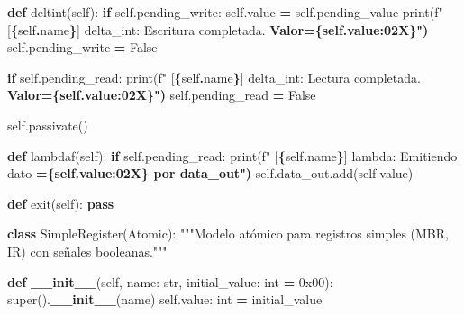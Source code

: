 \documentclass[12pt,oneside]{templates/unerthesis}
\newenvironment{Shaded}{\begin{snugshade}}{\end{snugshade}}
\newcommand{\BaseNTok}[1]{\textcolor[rgb]{0.00,0.00,0.81}{#1}}
\newcommand{\BuiltInTok}[1]{#1}
\newcommand{\ControlFlowTok}[1]{\textcolor[rgb]{0.13,0.29,0.53}{\textbf{#1}}}
\newcommand{\ErrorTok}[1]{\textcolor[rgb]{0.64,0.00,0.00}{\textbf{#1}}}
\newcommand{\FunctionTok}[1]{\textcolor[rgb]{0.13,0.29,0.53}{\textbf{#1}}}
\newcommand{\KeywordTok}[1]{\textcolor[rgb]{0.13,0.29,0.53}{\textbf{#1}}}
\newcommand{\NormalTok}[1]{#1}
\newcommand{\OperatorTok}[1]{\textcolor[rgb]{0.81,0.36,0.00}{\textbf{#1}}}
\newcommand{\SpecialCharTok}[1]{\textcolor[rgb]{0.81,0.36,0.00}{\textbf{#1}}}
\newcommand{\SpecialStringTok}[1]{\textcolor[rgb]{0.31,0.60,0.02}{#1}}
\newcommand{\StringTok}[1]{\textcolor[rgb]{0.31,0.60,0.02}{#1}}
\newcommand{\VariableTok}[1]{\textcolor[rgb]{0.00,0.00,0.00}{#1}}
\begin{document}
\begin{Shaded}
\begin{Highlighting}[]
    \KeywordTok{def}\NormalTok{ deltint(}\VariableTok{self}\NormalTok{):}
        \ControlFlowTok{if} \VariableTok{self}\NormalTok{.pending\_write:}
            \VariableTok{self}\NormalTok{.value }\OperatorTok{=} \VariableTok{self}\NormalTok{.pending\_value}
            \BuiltInTok{print}\NormalTok{(}\SpecialStringTok{f"  [}\SpecialCharTok{\{}\VariableTok{self}\SpecialCharTok{.}\NormalTok{name}\SpecialCharTok{\}}\SpecialStringTok{] delta\_int: Escritura completada.}
\ErrorTok{            Valor=\{self.value:02X\}")}
            \VariableTok{self}\NormalTok{.pending\_write }\OperatorTok{=} \VariableTok{False}
        
        \ControlFlowTok{if} \VariableTok{self}\NormalTok{.pending\_read:}
            \BuiltInTok{print}\NormalTok{(}\SpecialStringTok{f"  [}\SpecialCharTok{\{}\VariableTok{self}\SpecialCharTok{.}\NormalTok{name}\SpecialCharTok{\}}\SpecialStringTok{] delta\_int: Lectura completada.}
\ErrorTok{             Valor=\{self.value:02X\}")}
            \VariableTok{self}\NormalTok{.pending\_read }\OperatorTok{=} \VariableTok{False}
        
        \VariableTok{self}\NormalTok{.passivate()}
    
    \KeywordTok{def}\NormalTok{ lambdaf(}\VariableTok{self}\NormalTok{):}
        \ControlFlowTok{if} \VariableTok{self}\NormalTok{.pending\_read:}
            \BuiltInTok{print}\NormalTok{(}\SpecialStringTok{f"  [}\SpecialCharTok{\{}\VariableTok{self}\SpecialCharTok{.}\NormalTok{name}\SpecialCharTok{\}}\SpecialStringTok{] lambda: Emitiendo dato}
\ErrorTok{            =\{self.value:02X\} por data\_out")}
            \VariableTok{self}\NormalTok{.data\_out.add(}\VariableTok{self}\NormalTok{.value)}
    
    \KeywordTok{def}\NormalTok{ exit(}\VariableTok{self}\NormalTok{):}
        \ControlFlowTok{pass}


\KeywordTok{class}\NormalTok{ SimpleRegister(Atomic):}
    \StringTok{"""Modelo atómico para registros simples (MBR, IR) con señales}
\StringTok{     booleanas."""}
    
    \KeywordTok{def} \FunctionTok{\_\_init\_\_}\NormalTok{(}\VariableTok{self}\NormalTok{, name: }\BuiltInTok{str}\NormalTok{, initial\_value: }\BuiltInTok{int} \OperatorTok{=} \BaseNTok{0x00}\NormalTok{):}
        \BuiltInTok{super}\NormalTok{().}\FunctionTok{\_\_init\_\_}\NormalTok{(name)}
        \VariableTok{self}\NormalTok{.value: }\BuiltInTok{int} \OperatorTok{=}\NormalTok{ initial\_value}
        

\end{Highlighting}
\end{Shaded}
\end{document}
